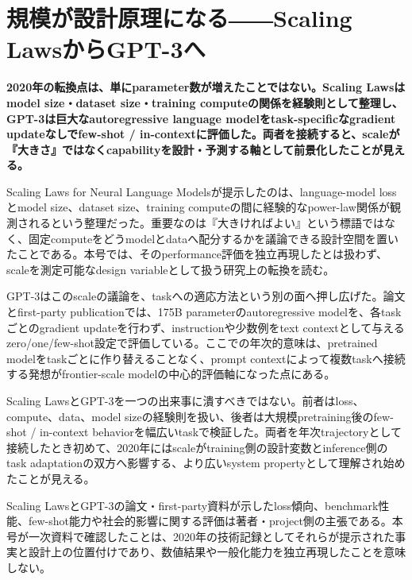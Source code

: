 \section{規模が設計原理になる――Scaling LawsからGPT-3へ}
\noindent\textbf{2020年の転換点は、単にparameter数が増えたことではない。Scaling Lawsはmodel size・dataset size・training computeの関係を経験則として整理し、GPT-3は巨大なautoregressive language modelをtask-specificなgradient updateなしでfew-shot / in-contextに評価した。両者を接続すると、scaleが『大きさ』ではなくcapabilityを設計・予測する軸として前景化したことが見える。}\autocite{src-0fc45aa25dc7,src-7a3002b6ab1d,src-8f27ffb5bc66}

Scaling Laws for Neural Language Modelsが提示したのは、language-model lossとmodel size、dataset size、training computeの間に経験的なpower-law関係が観測されるという整理だった。重要なのは『大きければよい』という標語ではなく、固定computeをどうmodelとdataへ配分するかを議論できる設計空間を置いたことである。本号では、そのperformance評価を独立再現したとは扱わず、scaleを測定可能なdesign variableとして扱う研究上の転換を読む。\autocite{src-7a3002b6ab1d}


GPT-3はこのscaleの議論を、taskへの適応方法という別の面へ押し広げた。論文とfirst-party publicationでは、175B parameterのautoregressive modelを、各taskごとのgradient updateを行わず、instructionや少数例をtext contextとして与えるzero/one/few-shot設定で評価している。ここでの年次的意味は、pretrained modelをtaskごとに作り替えることなく、prompt contextによって複数taskへ接続する発想がfrontier-scale modelの中心的評価軸になった点にある。\autocite{src-0fc45aa25dc7,src-8f27ffb5bc66}


Scaling LawsとGPT-3を一つの出来事に潰すべきではない。前者はloss、compute、data、model sizeの経験則を扱い、後者は大規模pretraining後のfew-shot / in-context behaviorを幅広いtaskで検証した。両者を年次trajectoryとして接続したとき初めて、2020年にはscaleがtraining側の設計変数とinference側のtask adaptationの双方へ影響する、より広いsystem propertyとして理解され始めたことが見える。\autocite{src-0fc45aa25dc7,src-7a3002b6ab1d,src-8f27ffb5bc66}


\begin{claimboundary}
Scaling LawsとGPT-3の論文・first-party資料が示したloss傾向、benchmark性能、few-shot能力や社会的影響に関する評価は著者・project側の主張である。本号が一次資料で確認したことは、2020年の技術記録としてそれらが提示された事実と設計上の位置付けであり、数値結果や一般化能力を独立再現したことを意味しない。\autocite{src-0fc45aa25dc7,src-7a3002b6ab1d,src-8f27ffb5bc66}
\end{claimboundary}
